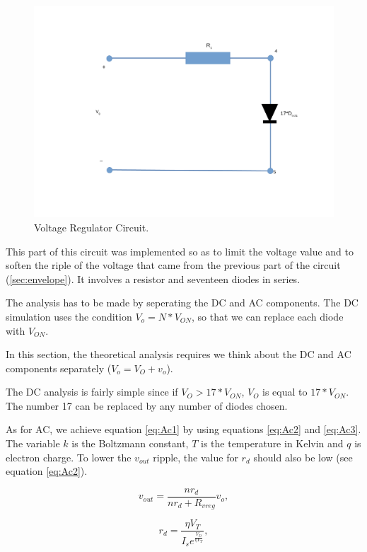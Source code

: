 \begin{figure}[!ht] \centering
    \includegraphics[width=1\linewidth]{voltageregulator.pdf}
    \caption{Voltage Regulator Circuit.}
    \label{fig:Regulator}
\end{figure}

This part of this circuit was implemented so as to limit the voltage value and to soften the riple of the voltage that came from the previous part of the circuit (\ref{sec:envelope}). It involves a resistor and seventeen diodes in series.


The analysis has to be made by seperating the DC and AC components. The DC simulation uses the condition $V_o=N * V_{ON}$, so that we can replace each diode with $V_{ON}$. 

In this section, the theoretical analysis requires we think about the DC and AC components separately ($V_o=V_O+v_o$). 

The DC analysis is fairly simple since if $V_O>17*V_{ON}$, $V_O$ is equal to $17*V_{ON}$. The number 17 can be replaced by any number of diodes chosen. 

As for AC, we achieve equation \ref{eq:Ac1} by using equations \ref{eq:Ac2} and \ref{eq:Ac3}. The variable $k$ is the Boltzmann constant, $T$ is the temperature in Kelvin and $q$ is electron charge. To lower the $v_{out}$ ripple, the value for $r_d$ should also be low (see equation \ref{eq:Ac2}).

\begin{equation}
    v_{out}=\frac{n r_{d}}{n r_{d} + R_{vreg}}v_o,
    \label{eq:Ac1}
\end{equation}

\begin{equation}
    r_{d}=\frac{\eta V_T}{I_s e^{\frac{V_D}{\eta V_T}}},
    \label{eq:Ac2}
\end{equation}

